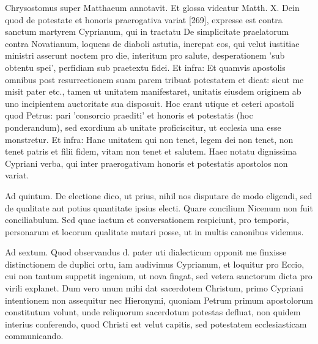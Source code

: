 Chrysostomus super Matthaeum annotavit. Et glossa videatur Matth. X. Dein quod de potestate et honoris praerogativa variat [269], expresse est contra sanctum martyrem Cyprianum, qui in tractatu De simplicitate praelatorum contra Novatianum, loquens de diaboli astutia, increpat eos, qui velut iustitiae ministri asserunt noctem pro die, interitum pro salute, desperationem 'sub obtentu spei', perfidiam sub praetextu fidei. Et infra: Et quamvis apostolis omnibus post resurrectionem suam parem tribuat potestatem et dicat: sicut me misit pater etc., tamen ut unitatem manifestaret, unitatis eiusdem originem ab uno incipientem auctoritate sua disposuit. Hoc erant utique et ceteri apostoli quod Petrus: pari 'consorcio praediti' et honoris et potestatis (hoc ponderandum), sed exordium ab unitate proficiscitur, ut ecclesia una esse monstretur. Et infra: Hanc unitatem qui non tenet, legem dei non tenet, non tenet patris et filii fidem, vitam non tenet et salutem. Haec notatu dignissima Cypriani verba, qui inter praerogativam honoris et potestatis apostolos non variat.

Ad quintum. De electione dico, ut prius, nihil nos disputare de modo eligendi, sed de qualitate aut potius quantitate ipsius electi. Quare concilium Nicenum non fuit conciliabulum. Sed quae iactum et conversationem respiciunt, pro temporis, personarum et locorum qualitate mutari posse, ut in multis canonibus videmus.

Ad sextum. Quod observandus d. pater uti dialecticum opponit me finxisse distinctionem de duplici ortu, iam audivimus Cyprianum, et loquitur pro Eccio, cui non tantum suppetit ingenium, ut nova fingat, sed vetera sanctorum dicta pro virili explanet. Dum vero unum mihi dat sacerdotem Christum, primo Cypriani intentionem non assequitur nec Hieronymi, quoniam Petrum primum apostolorum constitutum volunt, unde reliquorum sacerdotum potestas defluat, non quidem interius conferendo, quod Christi est velut capitis, sed potestatem ecclesiasticam communicando.

